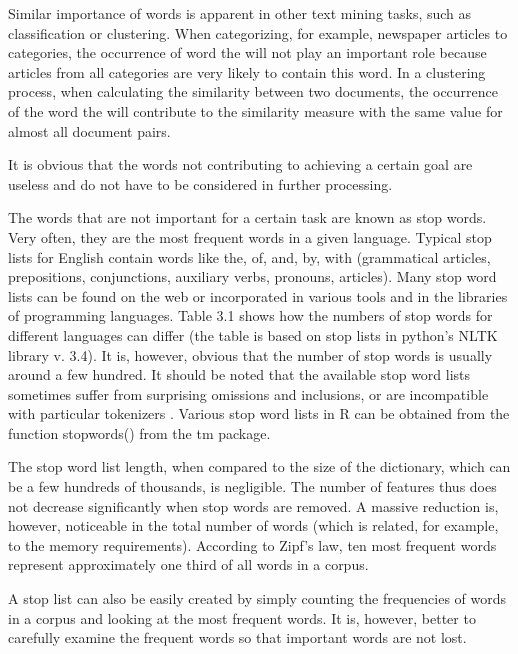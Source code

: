 \documentclass[11pt,openany,executivepaper]{book}
\begin{document}
Similar importance of words is apparent in other text mining tasks, such as classification or clustering. When categorizing, for example, newspaper articles to categories, the occurrence of word the will not play an important role because articles from all categories are very likely to contain this word. In a clustering process, when calculating the similarity between two documents, the occurrence of the word the will contribute to the similarity measure with the same value for almost all document pairs.

It is obvious that the words not contributing to achieving a certain goal are useless and do not have to be considered in further processing.

The words that are not important for a certain task are known as stop words. Very often, they are the most frequent words in a given language. Typical stop lists for English contain words like the, of, and, by, with (grammatical articles, prepositions, conjunctions, auxiliary verbs, pronouns, articles). Many stop word lists can be found on the web or incorporated in various tools and in the libraries of programming languages. Table 3.1 shows how the numbers of stop words for different languages can differ (the table is based on stop lists in python's NLTK library v. 3.4). It is, however, obvious that the number of stop words is usually around a few hundred. It should be noted that the available stop word lists sometimes suffer from surprising omissions and inclusions, or are incompatible with particular tokenizers \cite{207}. Various stop word lists in R can be obtained from the function stopwords() from the tm package.

The stop word list length, when compared to the size of the dictionary, which can be a few hundreds of thousands, is negligible. The number of features thus does not decrease significantly when stop words are removed. A massive reduction is, however, noticeable in the total number of words (which is related, for example, to the memory requirements). According to Zipf's law, ten most frequent words represent approximately one third of all words in a corpus.

A stop list can also be easily created by simply counting the frequencies of words in a corpus and looking at the most frequent words. It is, however, better to carefully examine the frequent words so that important words are not lost.
\end{document}
